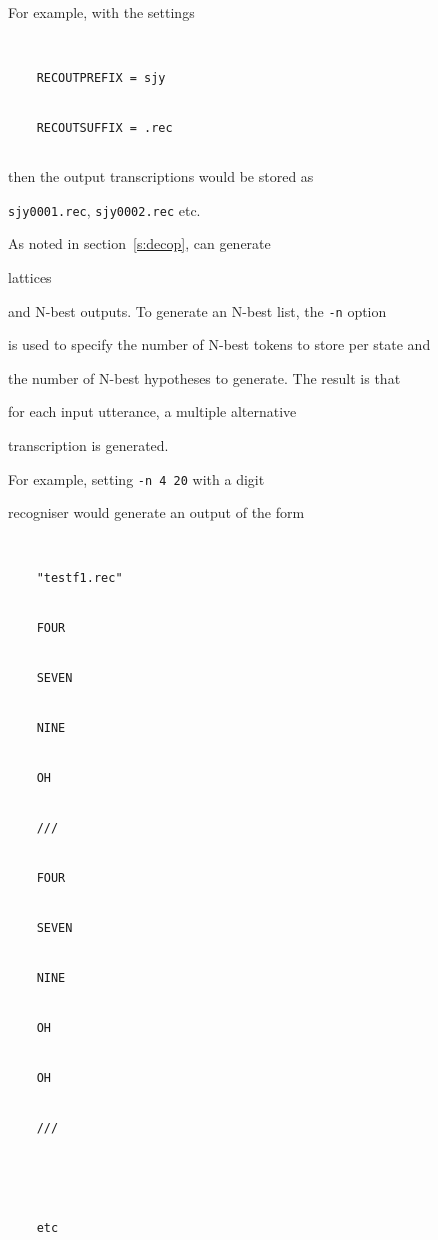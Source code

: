 For example, with the settings


\begin{verbatim}


    RECOUTPREFIX = sjy


    RECOUTSUFFIX = .rec


\end{verbatim}


then the output transcriptions would be stored as 


\texttt{sjy0001.rec},  \texttt{sjy0002.rec} etc.















As noted in section~\ref{s:decop},  can generate 


lattices


and N-best outputs.  To generate an N-best list, the \texttt{-n} option


is used to specify the number of N-best tokens to store per state and


the number of N-best hypotheses to generate.  The result is that


for each input utterance, a multiple alternative 


transcription is generated.


For example, setting \texttt{-n 4 20} with a digit 


recogniser would generate an output of the form


\begin{verbatim}


    "testf1.rec"


    FOUR


    SEVEN


    NINE


    OH


    /// 


    FOUR


    SEVEN


    NINE


    OH


    OH


    /// 





    etc


\end{verbatim}








